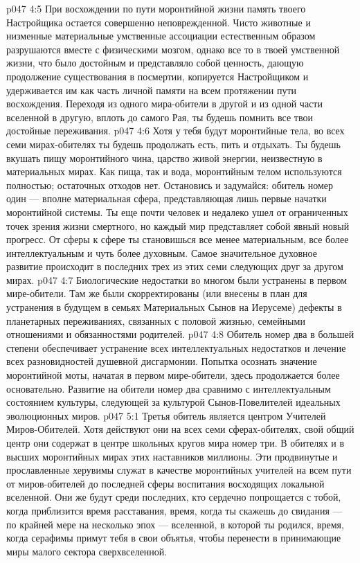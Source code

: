 \vs p047 4:5 При восхождении по пути моронтийной жизни память твоего Настройщика остается совершенно неповрежденной. Чисто животные и низменные материальные умственные ассоциации естественным образом разрушаются вместе с физическими мозгом, однако все то в твоей умственной жизни, что было достойным и представляло собой ценность, дающую продолжение существования в посмертии, копируется Настройщиком и удерживается им как часть личной памяти на всем протяжении пути восхождения. Переходя из одного мира\hyp{}обители в другой и из одной части вселенной в другую, вплоть до самого Рая, ты будешь помнить все твои достойные переживания.
\vs p047 4:6 Хотя у тебя будут моронтийные тела, во всех семи мирах\hyp{}обителях ты будешь продолжать есть, пить и отдыхать. Ты будешь вкушать пищу моронтийного чина, царство живой энергии, неизвестную в материальных мирах. Как пища, так и вода, моронтийным телом используются полностью; остаточных отходов нет. Остановись и задумайся: обитель номер один --- вполне материальная сфера, представляющая лишь первые начатки моронтийной системы. Ты еще почти человек и недалеко ушел от ограниченных точек зрения жизни смертного, но каждый мир представляет собой явный новый прогресс. От сферы к сфере ты становишься все менее материальным, все более интеллектуальным и чуть более духовным. Самое значительное духовное развитие происходит в последних трех из этих семи следующих друг за другом мирах.
\vs p047 4:7 Биологические недостатки во многом были устранены в первом мире\hyp{}обители. Там же были скорректированы (или внесены в план для устранения в будущем в семьях Материальных Сынов на Иерусеме) дефекты в планетарных переживаниях, связанных с половой жизнью, семейными отношениями и обязанностями родителей.
\vs p047 4:8 Обитель номер два в большей степени обеспечивает устранение всех интеллектуальных недостатков и лечение всех разновидностей душевной дисгармонии. Попытка осознать значение моронтийной моты, начатая в первом мире\hyp{}обители, здесь продолжается более основательно. Развитие на обители номер два сравнимо с интеллектуальным состоянием культуры, следующей за культурой Сынов\hyp{}Повелителей идеальных эволюционных миров.
\vs p047 5:1 Третья обитель является центром Учителей Миров\hyp{}Обителей. Хотя действуют они на всех семи сферах\hyp{}обителях, свой общий центр они содержат в центре школьных кругов мира номер три. В обителях и в высших моронтийных мирах этих наставников миллионы. Эти продвинутые и прославленные херувимы служат в качестве моронтийных учителей на всем пути от миров\hyp{}обителей до последней сферы воспитания восходящих локальной вселенной. Они же будут среди последних, кто сердечно попрощается с тобой, когда приблизится время расставания, время, когда ты скажешь до свидания --- по крайней мере на несколько эпох --- вселенной, в которой ты родился, время, когда серафимы примут тебя в свои объятья, чтобы перенести в принимающие миры малого сектора сверхвселенной.
